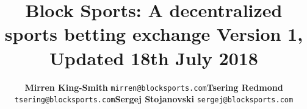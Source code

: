 \documentclass{article}
\begin{document}
\title{{\bfseries Block Sports}: A decentralized sports betting exchange \newline \newline \small Version 1, Updated 18th July 2018 \vspace{-4ex}}

\renewcommand{\arraystretch}{1}
\author{
	\footnotesize
	\hspace*{+.4cm}
	\begin{tabularx}{\textwidth}{ p{3.75cm} p{3.75cm} p{3.75cm}}
		\begin{center}
		\item {\bfseries Mirren King-Smith} \texttt{mirren@blocksports.com}
	 	\end{center} &
	 	\begin{center}
		\item {\bfseries Tsering Redmond} \texttt{tsering@blocksports.com}
	 	\end{center} &
	 	\begin{center}
		\item {\bfseries Sergej Stojanovski} \texttt{sergej@blocksports.com}
	 	\end{center}
	\end{tabularx}
}

\date{}

\maketitle
\renewcommand{\arraystretch}{2}
\end{document}
